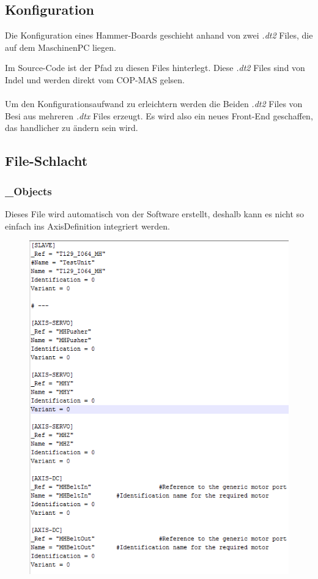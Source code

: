 	\subsection{Konfiguration}
		Die Konfiguration eines Hammer-Boards geschieht anhand von zwei \textit{.dt2} Files, die auf dem MaschinenPC liegen.
		
		Im Source-Code ist der Pfad zu diesen Files hinterlegt. Diese \textit{.dt2} Files sind von Indel und werden direkt vom COP-MAS gelsen.
		\\\\
		Um den Konfigurationsaufwand zu erleichtern werden die Beiden \textit{.dt2} Files von Besi aus mehreren \textit{.dtx} Files erzeugt. Es wird also ein neues Front-End geschaffen, das handlicher zu ändern sein wird.
		
	\subsection{File-Schlacht}
		\subsubsection{\_Objects}
			Dieses File wird automatisch von der Software erstellt, deshalb kann es nicht so einfach ins AxisDefinition integriert werden.
			\begin{figure}[!h]
				\centering
				\includegraphics[width=0.8\linewidth]{./pics/ccp/_objects.png}
				\caption{}
				\label{}
			\end{figure}
